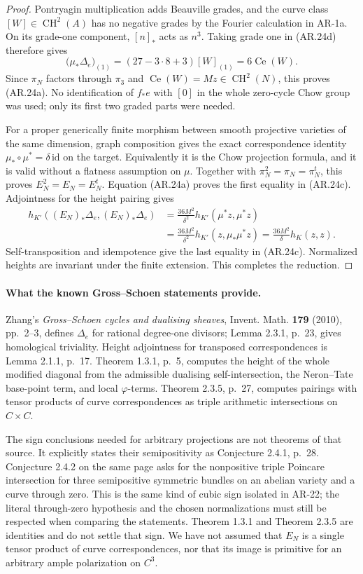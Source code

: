 \begin{proof}
Pontryagin multiplication adds Beauville grades, and the curve
class $[W]\in\operatorname{CH}^2(A)$ has no negative grades by
the Fourier calculation in AR-1a.  On its grade-one component,
$[n]_*$ acts as $n^3$.  Taking grade one in (AR.24d) therefore
gives
\[
 \bigl(\mu_*\Delta_e\bigr)_{(1)}
       =(27-3\cdot8+3)[W]_{(1)}=6\operatorname{Ce}(W).
\]
Since $\pi_N$ factors through $\pi_3$ and
$\operatorname{Ce}(W)=Mz\in\operatorname{CH}^2(N)$, this proves
(AR.24a).  No identification of $f_*e$ with $[0]$ in the whole
zero-cycle Chow group was used; only its first two graded parts
were needed.

For a proper generically finite morphism between smooth projective
varieties of the same dimension, graph composition gives the exact
correspondence identity
$\mu_*\circ\mu^*=\delta\,\mathrm{id}$ on the target.  Equivalently
it is the Chow projection formula, and it is valid without a
flatness assumption on $\mu$.  Together with
$\pi_N^2=\pi_N=\pi_N^t$, this proves
$E_N^2=E_N=E_N^t$.  Equation (AR.24a) proves the first equality in
(AR.24c).  Adjointness for the height pairing gives
\[
 \begin{split}
 h_{K'}((E_N)_*\Delta_e,(E_N)_*\Delta_e)
 &=\frac{36M^2}{\delta^2}
       h_{K'}(\mu^*z,\mu^*z)\\
 &=\frac{36M^2}{\delta^2}
       h_{K'}(z,\mu_*\mu^*z)
  =\frac{36M^2}{\delta}h_K(z,z).
 \end{split}
\]
Self-transposition and idempotence give the last equality in
(AR.24c).  Normalized heights are invariant under the finite
extension.  This completes the reduction.
\end{proof}

\paragraph{What the known Gross--Schoen statements provide.}
Zhang's \emph{Gross--Schoen cycles and dualising sheaves}, Invent.
Math. \textbf{179} (2010), pp.~2--3, defines $\Delta_e$ for rational
degree-one divisors; Lemma 2.3.1, p.~23, gives homological
triviality.  Height adjointness for transposed correspondences is
Lemma 2.1.1, p.~17.  Theorem 1.3.1, p.~5, computes the height of
the whole modified diagonal from the admissible dualising
self-intersection, the Neron--Tate base-point term, and local
$\varphi$-terms.  Theorem 2.3.5, p.~27, computes pairings with
tensor products of curve correspondences as triple arithmetic
intersections on $C\times C$.

The sign conclusions needed for arbitrary projections are not
theorems of that source.  It explicitly states their semipositivity
as Conjecture 2.4.1, p.~28.  Conjecture 2.4.2 on the same page
asks for the nonpositive triple Poincare intersection for three
semipositive symmetric bundles on an abelian variety and a curve
through zero.  This is the same kind of cubic sign isolated in
AR-22; the literal through-zero hypothesis and the chosen
normalizations must still be respected when comparing the
statements.  Theorem 1.3.1 and Theorem 2.3.5 are identities and do
not settle that sign.  We have not assumed that $E_N$ is a single
tensor product of curve correspondences, nor that its image is
primitive for an arbitrary ample polarization on $C^3$.

